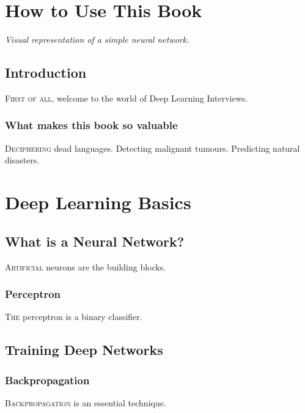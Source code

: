 \documentclass{book}
\begin{document}
\chapter{How to Use This Book}

\begin{center}

\vspace{0.5cm}
{\itshape Visual representation of a simple neural network.}
\end{center}

\section{Introduction}
\lettrine{F}{irst of all}, welcome to the world of Deep Learning Interviews. \lipsum[1]

\subsection{What makes this book so valuable}
\lettrine{D}{eciphering} dead languages. Detecting malignant tumours. Predicting natural disasters. \lipsum[2]

\chapter{Deep Learning Basics}

\section{What is a Neural Network?}
\lettrine{A}{rtificial} neurons are the building blocks. \lipsum[3]

\subsection{Perceptron}
\lettrine{T}{he} perceptron is a binary classifier. \lipsum[4]

\section{Training Deep Networks}
\subsection{Backpropagation}
\lettrine{B}{ackpropagation} is an essential technique. \lipsum[5]
\end{document}
